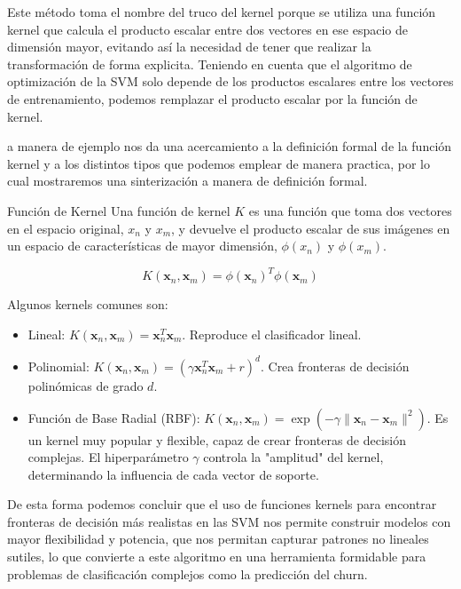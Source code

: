 Este método toma el nombre del truco del kernel porque se utiliza una función kernel que calcula el producto escalar entre dos vectores en ese espacio de dimensión mayor, evitando así la necesidad de tener que realizar la transformación de forma explicita. Teniendo en cuenta que el algoritmo de optimización de la SVM solo depende de los productos escalares entre los vectores de entrenamiento, podemos remplazar el producto escalar por la función de kernel.

\cite{StatisticalLearning} a manera de ejemplo nos da una acercamiento a la definición formal de la función kernel y a los distintos tipos que podemos emplear de manera practica, por lo cual mostraremos una sinterización a manera de definición formal.

\begin{definicion}{Función de Kernel}
	Una función de kernel $K$ es una función que toma dos vectores en el espacio original, $x_n$ y $x_m$, y devuelve el producto escalar de sus imágenes en un espacio de características de mayor dimensión, $\phi(x_n)$ y $\phi(x_m)$.
	
	\begin{equation}
		K(\mathbf{x}_n, \mathbf{x}_m) = \phi(\mathbf{x}_n)^T \phi(\mathbf{x}_m)
	\end{equation}
	
	Algunos kernels comunes son:
	\begin{itemize}
		\item Lineal: $K(\mathbf{x}_n, \mathbf{x}_m) = \mathbf{x}_n^T \mathbf{x}_m$. Reproduce el clasificador lineal.
		\item Polinomial: $K(\mathbf{x}_n, \mathbf{x}_m) = (\gamma \mathbf{x}_n^T \mathbf{x}_m + r)^d$. Crea fronteras de decisión polinómicas de grado $d$.
		\item Función de Base Radial (RBF): $K(\mathbf{x}_n, \mathbf{x}_m) = \exp(-\gamma \|\mathbf{x}_n - \mathbf{x}_m\|^2)$. Es un kernel muy popular y flexible, capaz de crear fronteras de decisión complejas. El hiperparámetro $\gamma$ controla la "amplitud" del kernel, determinando la influencia de cada vector de soporte.
	\end{itemize}
\end{definicion}


De esta forma podemos concluir que el uso de funciones kernels para encontrar fronteras de decisión más realistas en las SVM nos permite construir modelos con mayor flexibilidad y potencia, que nos permitan capturar patrones no lineales sutiles, lo que convierte a este algoritmo en una herramienta formidable para problemas de clasificación complejos como la predicción del churn. 

